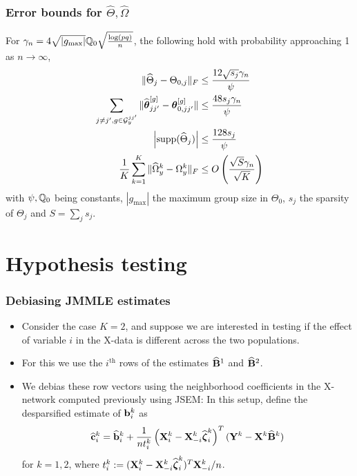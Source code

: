 \documentclass[10pt]{beamer}
\theoremstyle{definition}
\DeclareMathOperator*{\supp}{\text{supp}}
\begin{document}
\begin{frame}
\frametitle{Error bounds for $\widehat \Theta, \widehat\Omega$}

For $\gamma_n = 4 \sqrt{| g_{\max}|} {\mathbb{Q}}_0 \sqrt{ \frac{ \log(pq)}{n}}$, the following hold with probability approaching 1 as $n \rightarrow \infty$,
%
\begin{align*}
\| \widehat \Theta_j - \Theta_{0,j} \|_F & \leq \frac{12 \sqrt{s_j} \gamma_n}{\psi} \\
\sum_{j \neq j', g \in \cG_y^{jj'}} \| \widehat \bftheta_{jj'}^{[g]} - \bftheta_{0,jj'}^{[g]} \| & \leq \frac{48 s_j \gamma_n}{\psi} \\
\left| \supp (\widehat \Theta_j) \right| & \leq
\frac{128 s_j}{ \psi}\\
\frac{1}{K} \sum_{k=1}^K \| \widehat \Omega_y^k - \Omega_y^k \|_F & \leq
O \left( \frac{\sqrt S \gamma_n }{\sqrt K} \right)\\
\end{align*}
%
with $\psi, {\mathbb{Q}}_0$ being constants, $| g_{\max} |$ the maximum group size in $\Theta_0$, $s_j$ the sparsity of $\Theta_j$ and $S = \sum_j s_j$.
\end{frame}

\section{Hypothesis testing}
\begin{frame}
\frametitle{Debiasing JMMLE estimates}

\begin{itemize}
\item Consider the case $K=2$, and suppose we are interested in testing if the effect of variable $i$ in the X-data is different across the two populations.
\vspace{1em}

\item For this we use the $i^{\text{th}}$ rows of the estimates $\widehat {{\mathbf{B}}}^1$ and $\widehat {{\mathbf{B}}}^2$.
\vspace{1em}

\item We debias these row vectors using the neighborhood coefficients in the X-network computed previously using JSEM:
%
In this setup, define the desparsified estimate of ${\bf{b}}_i^k$ as
%
\begin{align*}
\widehat {{\bf{c}}}_i^k = \widehat {{\bf{b}}}_i^k + \frac{1}{n t_i^k} \left( {\mathbf{X}}_i^k - {\mathbf{X}}_{-i}^k \widehat {{\boldsymbol{\zeta}}}_i^k \right)^T
({\mathbf{Y}}^k - {\mathbf{X}}^k \widehat {{\mathbf{B}}}^k )
\end{align*}
%
for $k = 1,2$, where $t_i^k := ( {\mathbf{X}}_i^k - {\mathbf{X}}_{-i}^k \widehat {{\boldsymbol{\zeta}}}_i^k )^T {\mathbf{X}}_{-i}^k/n$.
\end{itemize}

\end{frame}
\end{document}
